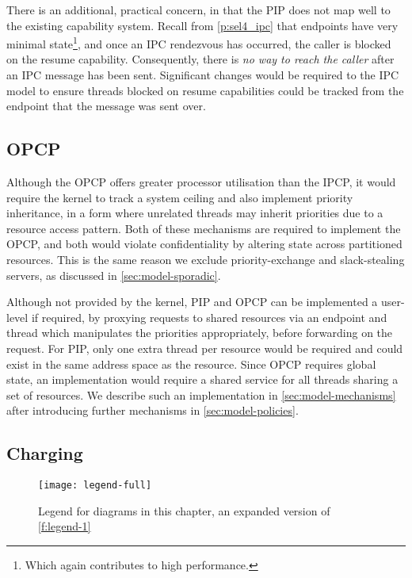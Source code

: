 There is an additional, practical concern, in that the \gls{PIP} does not map well to the existing
capability system. Recall from \cref{p:sel4_ipc} that endpoints have very minimal state\footnote{Which
again contributes to high performance.}, and once an IPC rendezvous has occurred, the caller is
blocked on the resume capability. Consequently, there is \emph{no way to reach the caller} after an 
\gls{IPC} message has been sent. 
Significant changes would be required to the \gls{IPC} model to ensure threads
blocked on resume capabilities could be tracked from the endpoint that the message was sent over.



\subsection{\gls{OPCP}}

Although the \gls{OPCP} offers greater processor utilisation than the \gls{IPCP}, it would require the
kernel to track a system ceiling and also implement priority inheritance, in a form where unrelated
threads may inherit priorities due to a resource access pattern. Both of these mechanisms are
required to implement the \gls{OPCP}, and both would violate confidentiality by altering state 
across partitioned resources.  This is the same reason we exclude
priority-exchange and slack-stealing servers, as discussed in \cref{sec:model-sporadic}.

Although not provided by the kernel, \gls{PIP} and \gls{OPCP} can be implemented a user-level if
required, by proxying requests to shared resources via an endpoint and thread which manipulates the priorities
appropriately, before forwarding on the request. For \gls{PIP}, only one extra thread per resource would 
be required and could exist in the same address space as the resource.
Since \gls{OPCP} requires global state, an implementation would require a shared service for all threads 
sharing a set of resources. We describe such an implementation in \cref{sec:model-mechanisms} after introducing further mechanisms
in \cref{sec:model-policies}.

\subsection{Charging}

\begin{figure}
    \centering
    \texttt{[image: legend-full]}
    \caption[Legend for diagrams in this chapter.]{Legend for diagrams in this chapter, an expanded version of \cref{f:legend-1}}
    \label{f:legend-2}
\end{figure}


